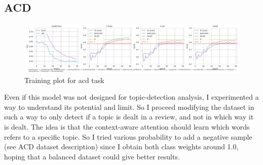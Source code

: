 \documentclass{article}
\begin{document}
        \subsection{ACD}\label{subsec:s2}
            \begin{figure}
                \includegraphics[width=\linewidth]{../experiments/acd/plots.png}
                \caption{Training plot for acd task}
                \label{fig:train-acd}
            \end{figure}
            Even if this model was not designed for topic-detection analysis, I experimented a way to understand its potential and limit.
            So I proceed modifying the dataset in such a way to only detect if a topic is dealt in a review, and not in which way it is dealt.
            The idea is that the context-aware attention should learn which words refers to a specific topic.
            So I tried various probability to add a negative sample (see ACD dataset description) since I obtain both class weights around 1.0, hoping that a balanced dataset could give better results.
\end{document}
